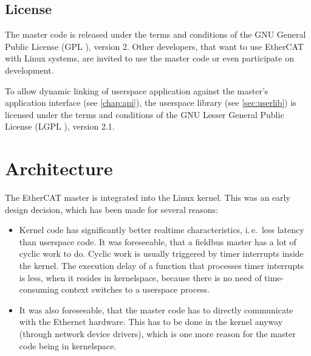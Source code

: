 \documentclass[a4paper,12pt,BCOR=6mm,bibtotoc,idxtotoc]{scrbook}
\begin{document}

\section{License}
\label{sec:license}

The master code is released under the terms and conditions of the GNU General
Public License (GPL \cite{gpl}), version 2. Other developers, that
want to use EtherCAT with Linux systems, are invited to use the master code or
even participate on development.

To allow dynamic linking of userspace application against the master's
application interface (see \autoref{chap:api}), the userspace library (see
\autoref{sec:userlib}) is licensed under the terms and conditions of the GNU
Lesser General Public License (LGPL \cite{lgpl}), version 2.1.


\chapter{Architecture}
\label{chap:arch}

The EtherCAT master is integrated into the Linux kernel. This was an early
design decision, which has been made for several reasons:

\begin{itemize}

\item Kernel code has significantly better realtime characteristics, i.\,e.\
less latency than userspace code. It was foreseeable, that a fieldbus master
has a lot of cyclic work to do. Cyclic work is usually triggered by timer
interrupts inside the kernel. The execution delay of a function that processes
timer interrupts is less, when it resides in kernelspace, because there is no
need of time-consuming context switches to a userspace process.

\item It was also foreseeable, that the master code has to directly
communicate with the Ethernet hardware. This has to be done in the kernel
anyway (through network device drivers), which is one more reason for the
master code being in kernelspace.

\end{itemize}
\end{document}
